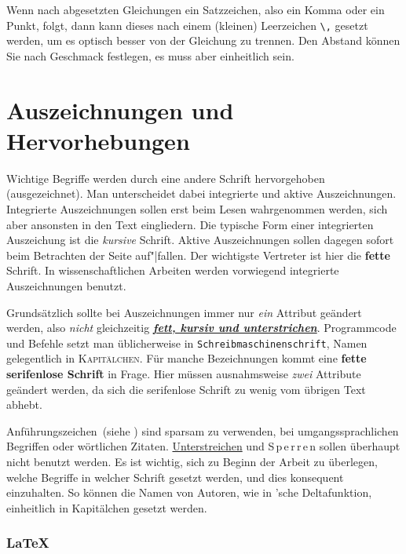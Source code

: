 Wenn nach abgesetzten Gleichungen ein Satzzeichen, also ein Komma oder ein Punkt, folgt, dann kann dieses nach einem (kleinen) Leerzeichen \verb|\,| gesetzt werden, um es optisch besser von der Gleichung zu trennen.
Den Abstand können Sie nach Geschmack festlegen, es muss aber einheitlich sein.



\section{Auszeichnungen und Hervorhebungen}
Wichtige Begriffe werden durch eine andere Schrift hervorgehoben (ausgezeichnet).
Man unterscheidet dabei integrierte und aktive Auszeichnungen.
Integrierte Auszeichnungen sollen erst beim Lesen wahrgenommen werden, sich aber ansonsten in den Text eingliedern.
Die typische Form einer integrierten Auszeichung ist die \emph{kursive} Schrift.
Aktive Auszeichnungen sollen dagegen sofort beim Betrachten der Seite auf"|fallen.
Der wichtigste Vertreter ist hier die \textbf{fette} Schrift.
In wissenschaftlichen Arbeiten werden vorwiegend integrierte Auszeichnungen benutzt.

Grundsätzlich sollte bei Auszeichnungen immer nur \emph{ein} Attribut geändert werden, also \emph{nicht} gleichzeitig \emph{\underline{\textbf{fett, kursiv und
unterstrichen}}}.
Programmcode und Befehle setzt man üblicherweise in \texttt{Schreib\-ma\-schin\-en\-schrift}, Namen gelegentlich in \textsc{Kapitälchen}.
Für manche Bezeichnungen kommt eine \textsf{\textbf{fette serifenlose Schrift}} in Frage.
Hier müssen ausnahmsweise \emph{zwei} Attribute geändert werden, da sich die \textsf{serifenlose Schrift} zu wenig vom übrigen Text abhebt.

\glqq Anführungszeichen\grqq\ (siehe ) sind sparsam zu verwenden, \zB bei umgangssprachlichen Begriffen oder wörtlichen Zitaten.
\underline{Unterstreichen} und \mbox{S\,p\,e\,r\,r\,e\,n} sollen überhaupt nicht benutzt werden.
Es ist wichtig, sich zu Beginn der Arbeit zu überlegen, welche Begriffe in welcher Schrift gesetzt werden, und dies konsequent einzuhalten.
So können \bspw die Namen von Autoren, wie in 'sche Deltafunktion, einheitlich in Kapitälchen gesetzt werden.



\subsubsection*{\LaTeX}

